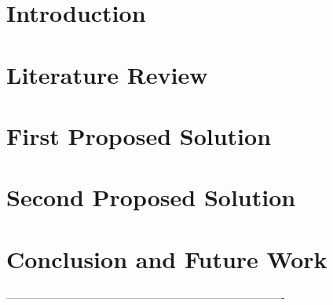 \documentclass[11pt,oneside,final]{ntu_qe}
\newcommand{\setdoublespace}{\dsp}
\newcommand*\NewPage{\newpage\null\thispagestyle{empty}\newpage}
\begin{document}
\setdoublespace


\hsp
\NewPage

\hsp
\chapter{Introduction}\label{CH1} %

\chapter{Literature Review}\label{CH2}

\chapter{First Proposed Solution}\label{CH3}

\chapter{Second Proposed Solution}\label{CH4}

\chapter{Conclusion and Future Work}\label{CH5}

%
---------------------------------------------------------------------------- %
\end{document}
